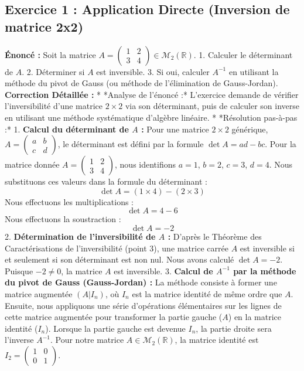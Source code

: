 \documentclass[12pt,a4paper]{report}
\begin{document}
\subsection{Exercice 1 : Application Directe (Inversion de matrice 2x2)}
\textbf{Énoncé :} Soit la matrice $A = \begin{pmatrix} 1 & 2 \\ 3 & 4 \end{pmatrix} \in \mathcal{M}_2(\mathbb{R})$.
1.  Calculer le déterminant de $A$.
2.  Déterminer si $A$ est inversible.
3.  Si oui, calculer $A^{-1}$ en utilisant la méthode du pivot de Gauss (ou méthode de l'élimination de Gauss-Jordan).
\textbf{Correction Détaillée :}
*   *Analyse de l'énoncé :* L'exercice demande de vérifier l'inversibilité d'une matrice $2 \times 2$ via son déterminant, puis de calculer son inverse en utilisant une méthode systématique d'algèbre linéaire.
*   *Résolution pas-à-pas :*
    1.  \textbf{Calcul du déterminant de $A$ :}
        Pour une matrice $2 \times 2$ générique, $A = \begin{pmatrix} a & b \\ c & d \end{pmatrix}$, le déterminant est défini par la formule $\det A = ad - bc$.
        Pour la matrice donnée $A = \begin{pmatrix} 1 & 2 \\ 3 & 4 \end{pmatrix}$, nous identifions $a=1$, $b=2$, $c=3$, $d=4$.
        Nous substituons ces valeurs dans la formule du déterminant :
        $$\det A = (1 \times 4) - (2 \times 3)$$
        Nous effectuons les multiplications :
        $$\det A = 4 - 6$$
        Nous effectuons la soustraction :
        $$\det A = -2$$
    2.  \textbf{Détermination de l'inversibilité de $A$ :}
        D'après le Théorème des Caractérisations de l'inversibilité (point 3), une matrice carrée $A$ est inversible si et seulement si son déterminant est non nul.
        Nous avons calculé $\det A = -2$.
        Puisque $-2 \neq 0$, la matrice $A$ est inversible.
    3.  \textbf{Calcul de $A^{-1}$ par la méthode du pivot de Gauss (Gauss-Jordan) :}
        La méthode consiste à former une matrice augmentée $(A | I_n)$, où $I_n$ est la matrice identité de même ordre que $A$. Ensuite, nous appliquons une série d'opérations élémentaires sur les lignes de cette matrice augmentée pour transformer la partie gauche ($A$) en la matrice identité ($I_n$). Lorsque la partie gauche est devenue $I_n$, la partie droite sera l'inverse $A^{-1}$.
        Pour notre matrice $A \in \mathcal{M}_2(\mathbb{R})$, la matrice identité est $I_2 = \begin{pmatrix} 1 & 0 \\ 0 & 1 \end{pmatrix}$.
\end{document}
